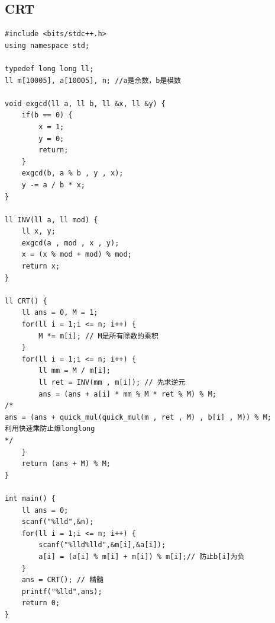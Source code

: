 \documentclass[twoside]{article}
\begin{document}
\subsection{CRT}
\begin{lstlisting}
#include <bits/stdc++.h>
using namespace std;

typedef long long ll;
ll m[10005], a[10005], n; //a是余数，b是模数

void exgcd(ll a, ll b, ll &x, ll &y) {
    if(b == 0) {
        x = 1;
        y = 0;
        return;
    }
    exgcd(b, a % b , y , x);
    y -= a / b * x;
}

ll INV(ll a, ll mod) {
    ll x, y;
    exgcd(a , mod , x , y);
    x = (x % mod + mod) % mod;
    return x;
}

ll CRT() {
    ll ans = 0, M = 1;
    for(ll i = 1;i <= n; i++) {
        M *= m[i]; // M是所有除数的乘积
    }
    for(ll i = 1;i <= n; i++) {
        ll mm = M / m[i];
        ll ret = INV(mm , m[i]); // 先求逆元
        ans = (ans + a[i] * mm % M * ret % M) % M;
/*
ans = (ans + quick_mul(quick_mul(m , ret , M) , b[i] , M)) % M;
利用快速乘防止爆longlong 
*/
    }
    return (ans + M) % M;
}

int main() {
    ll ans = 0;
    scanf("%lld",&n);
    for(ll i = 1;i <= n; i++) {
        scanf("%lld%lld",&m[i],&a[i]);
        a[i] = (a[i] % m[i] + m[i]) % m[i];// 防止b[i]为负
    }
    ans = CRT(); // 精髓
    printf("%lld",ans);
    return 0;
}\end{lstlisting}
\end{document}
